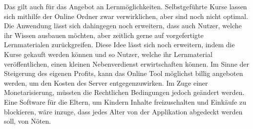 Das gilt auch für das Angebot an Lernmöglichkeiten. Selbstgeführte Kurse lassen sich mithilfe der Online Ordner zwar verwirklichen, aber sind noch nicht optimal. Die Anwendung lässt sich dahingegen noch erweitern, dass auch Nutzer, welche ihr Wissen ausbauen möchten, aber zeitlich gerne auf vorgefertigte Lernmaterialen zurückgreifen. Diese Idee lässt sich noch erweitern, indem die Kurse gekauft werden können und so Nutzer, welche ihr Lernmaterial veröffentlichen, einen kleinen Nebenverdienst erwirtschaften können. Im Sinne der Steigerung des eigenen Profits, kann das Online Tool möglichst billig angeboten werden, um den Kosten des Server entgegenzuwirken. Im Zuge einer Monetarisierung, müssten die Rechtlichen Bedingungen jedoch geändert werden. Eine Software für die Eltern, um Kindern Inhalte freizuschalten und Einkäufe zu blockieren, wäre inzuge, dass jedes Alter von der Applikation abgedeckt werden soll, von Nöten.
